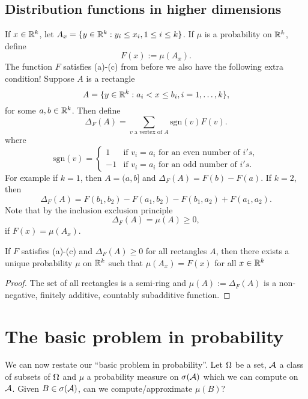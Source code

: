 \subsection{Distribution functions in higher dimensions}
If $x \in {\mathbb R}^k$, let $A_x = \{ y\in {\mathbb R}^k : y_i \le x_i, 1 \le i \le k \}$. If $\mu$ is a probability on ${\mathbb R}^k$, define 
\[F(x) := \mu(A_x). \]
The function $F$ satisfies (a)-(c) from before we also have the following extra condition! Suppose $A$ is a rectangle
\[A = \{y \in {\mathbb R}^k : a_i < x \le b_i, i=1,\ldots, k\}, \]
for some $a,b \in {\mathbb R}^k$. Then define
\[\Delta_F(A) = \sum_{v \text{ a vertex of } A} \text{sgn}(v)F(v). \]
where 
\[\text{sgn}(v) = \begin{cases}
    1 & \text{if } v_i = a_i \text{ for an even number of } i's,\\
    -1 & \text{if }v_i = a_i \text{ for an odd number of } i's.
\end{cases} \]
For example if $k=1$, then $A= (a,b]$ and $\Delta_F(A) = F(b)-F(a)$. If $k=2$, then
\[\Delta_F(A) = F(b_1,b_2) - F(a_1,b_2) - F(b_1, a_2) + F(a_1,a_2). \]
Note that by the inclusion exclusion principle 
\[\Delta_F(A) = \mu(A) \ge 0, \]
if $F(x) = \mu(A_x)$.
\begin{thrm}
    If $F$ satisfies (a)-(c) and $\Delta_F(A) \ge 0$ for all rectangles $A$, then there exists a unique probability $\mu$ on ${\mathbb R}^k$ such that $\mu(A_x) = F(x)$ for all $x \in {\mathbb R}^k$
\end{thrm}
\begin{proof}
    The set of all rectangles is a semi-ring and $\mu(A) := \Delta_F(A)$ is a non-negative, finitely additive, countably subadditive function.
\end{proof}
\section{The basic problem in probability}
We can now restate our ``basic problem in probability''. Let ${{\Omega}}$ be a set, ${\mathcal{A}}$ a class of subsets of ${{\Omega}}$ and $\mu$ a probability measure on $\sigma({\mathcal{A}})$ which we can compute on ${\mathcal{A}}$. Given $B \in \sigma({\mathcal{A}})$, can we compute/approximate $\mu(B)$?
